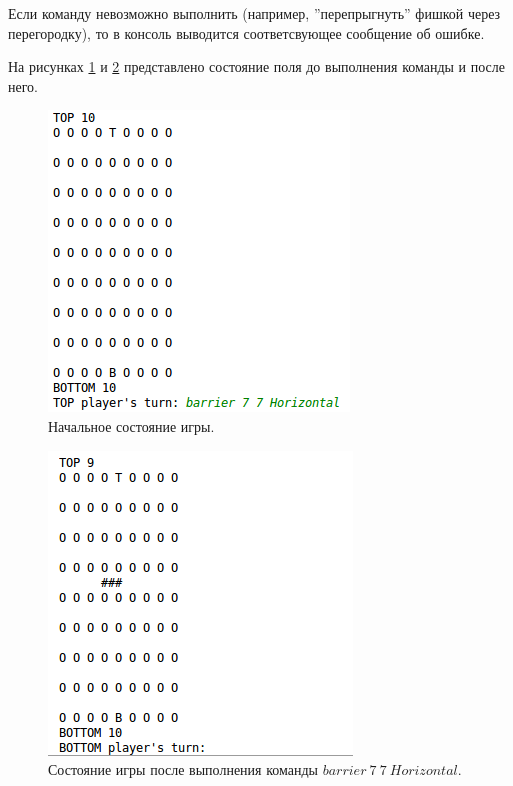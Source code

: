 \documentclass[a4paper]{article}
\begin{document}
Если команду невозможно выполнить (например, ''перепрыгнуть'' фишкой через перегородку), то в консоль выводится соответсвующее сообщение об ошибке.


На рисунках \ref{pic:console1} и \ref{pic:console2} представлено состояние поля до выполнения команды и после него. 

\begin{figure}[H]
	\begin{center}
		\includegraphics[scale=0.5]{console1}
		\caption{Начальное состояние игры.} 
		\label{pic:console1} %
	\end{center}
\end{figure}

\begin{figure}[H]
	\begin{center}
		\includegraphics[scale=0.5]{console2}
		\caption{Состояние игры после выполнения команды $barrier~7~7~Horizontal$.} 
		\label{pic:console2} %
	\end{center}
\end{figure}
\end{document}
